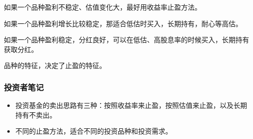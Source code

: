 如果一个品种盈利不稳定、估值变化大，最好用收益率止盈方法。

如果一个品种盈利增长比较稳定，那适合低估时买入，长期持有，耐心等高估。

如果一个品种盈利稳定，分红良好，可以在低估、高股息率的时候买入，长期持有获取分红。

品种的特征，决定了止盈的特征。

\subsubsection{投资者笔记}

\begin{itemize}
\item {\kaishu 投资基金的卖出思路有三种：按照收益率来止盈，按照估值来止盈，以及长期持有不卖出。}
\item {\kaishu 不同的止盈方法，适合不同的投资品种和投资需求。}
\end{itemize}

